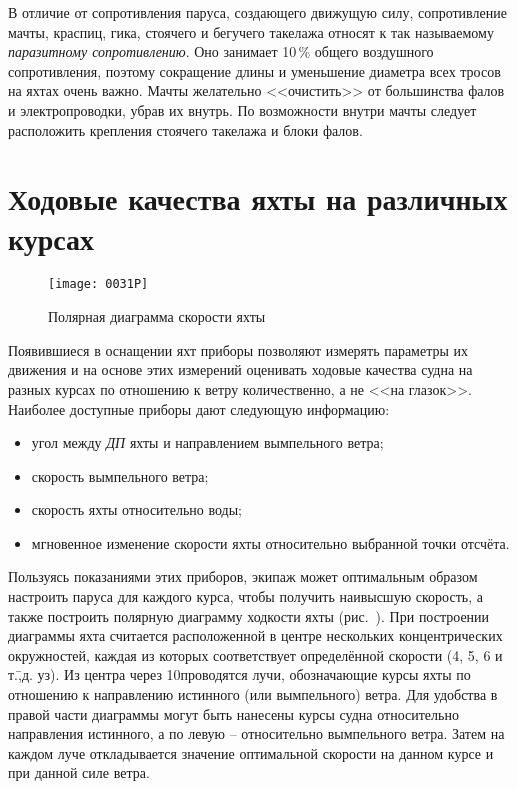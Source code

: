 В отличие от сопротивления паруса, создающего движущую силу,
сопротивление мачты, краспиц, гика, стоячего и бегучего такелажа
относят к так называемому \textit{паразитному
сопротивлению}. Оно занимает 10\,\% общего воздушного сопротивления, поэтому сокращение длины и
уменьшение диаметра всех тросов на яхтах очень важно. Мачты желательно
<<очистить>> от большинства фалов и электропроводки, убрав их
внутрь. По возможности внутри мачты следует расположить крепления
стоячего такелажа и блоки фалов.

\section{Ходовые качества яхты на различных курсах}

\begin{figure}[htb]
  \centering
  \texttt{[image: 0031P]}
  \caption{Полярная диаграмма скорости яхты}
  \label{fig:31}
\end{figure}

Появившиеся в оснащении яхт приборы позволяют измерять параметры их
движения и на основе этих измерений оценивать ходовые качества судна
на разных курсах по отношению к ветру количественно, а не <<на
глазок>>. Наиболее доступные приборы дают следующую информацию:

\begin{itemize}
\item угол между \textit{ДП} яхты и направлением вымпельного ветра; 
\item скорость вымпельного ветра; 
\item скорость яхты относительно воды; 
\item мгновенное изменение скорости яхты относительно выбранной точки отсчёта. 
\end{itemize}

Пользуясь показаниями этих приборов, экипаж может оптимальным образом
настроить паруса для каждого курса, чтобы получить наивысшую скорость,
а также построить полярную диаграмму ходкости яхты
(рис.~). При построении диаграммы яхта считается расположенной
в центре нескольких концентрических окружностей, каждая из которых
соответствует определённой скорости (4, 5, 6 и т.\=,д. уз). Из центра
через 10\gr проводятся лучи, обозначающие курсы яхты по отношению к
направлению истинного (или вымпельного) ветра. Для удобства в правой
части диаграммы могут быть нанесены курсы судна относительно
направления истинного, а по левую \--- относительно вымпельного
ветра. Затем на каждом луче откладывается значение оптимальной
скорости на данном курсе и при данной силе ветра.

